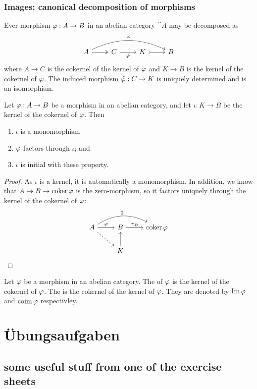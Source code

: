 \documentclass[11pt,twoside]{memoir}
\begin{document}
\subsection{Images; canonical decomposition of morphisms}
\begin{thm}
	Ever morphism $\varphi:A\to B$ in an abelian category $\cat{A}$ may be decomposed as
	\[
	\begin{tikzcd}
	A\ar[bend left=25]{rrr}{\pphi} \ar[\surarr]{r} & C \ar[swap]{r}{\tilde{\pphi}}&K\ar[\monarr]{r}&B
	\end{tikzcd}
	\]
	where $A\to C$ is the cokernel of the kernel of $\varphi$ and $K\to B$ is the kernel of the cokernel of $\varphi$. The induced morphism $\tilde{\varphi}:C\to K$ is uniquely determined and is an isomorphism.
\end{thm}

\begin{lem}
	Let $\varphi:A\to B$ be a morphism in an abelian category, and let $\iota:K\to B$ be the kernel of the cokernel of $\varphi$. Then
	\begin{enumerate}
		\item $\iota$ is a monomorphism
		\item $\varphi$ factors through $\iota$; and
		\item $\iota$ is initial with these property.
	\end{enumerate}
\end{lem}
\begin{proof}
	As $\iota$ is a kernel, it is automatically a monomorphism. In addition, we know that $A\to B\to \operatorname{coker} \varphi$ is the zero-morphism, so it factors uniquely through the kernel of the cokernel of $\varphi$:
	\[
	\begin{tikzcd}
	A\ar{r}{\pphi}\ar[dashed]{dr}\ar[bend left]{rr}{0}&B\ar{r}{\pi_B}&\coker \pphi\\
	&K\ar{u}&
	\end{tikzcd}
	\]
\end{proof}
\begin{defn}
	Let $\varphi$ be a morphism in an abelian category. The  of $\varphi$ is the kernel of the cokernel of $\varphi$. The  is the cokernel of the kernel of $\varphi$. They are denoted by $\operatorname{Im} \varphi$ and $\operatorname{coim} \varphi$ respectivley.
\end{defn}
\thispagestyle{rlast}


\appendix
\chapter{Übungsaufgaben}
\section{some useful stuff from one of the exercise sheets}
\backmatter
\printbibliography[heading = bibintoc]
\printindex
\end{document}
